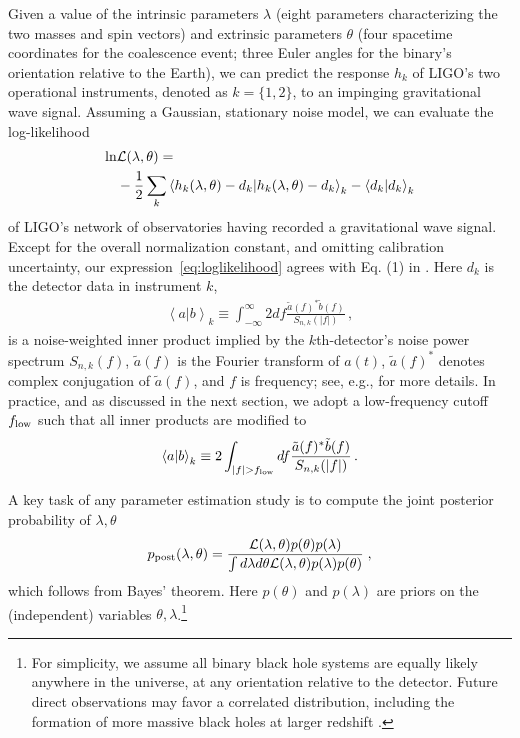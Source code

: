 \documentclass[aps,prd,nofootinbib,showpacs,amssymb,twocolumn]{revtex4}
\newcommand\qmstateproduct[2]{\left<#1|#2\right>}
\begin{document}
%
Given a value of the intrinsic parameters $\lambda$ (eight parameters characterizing the two masses and spin vectors)
and extrinsic parameters $\theta$ (four spacetime coordinates for the coalescence
event; three Euler
angles for the binary's orientation relative to the Earth),  we can predict the response $h_k$ of 
LIGO's two operational instruments, denoted as  $k=\{1,2\}$, to an impinging
gravitational wave signal.
%
%
Assuming a Gaussian, stationary noise model, we can evaluate the log-likelihood
\begin{align} \label{eq:loglikelihood}
\ln & {\cal L}(\lambda, \theta) = \nonumber \\
& -\frac{1}{2}\sum_k \qmstateproduct{h_k(\lambda,\theta)-d_k}{h_k(\lambda,\theta)-d_k}_k  
%
 - \qmstateproduct{d_k}{d_k}_k
%
%
%
%
%
%
%
%
%
%
%
\end{align}
of LIGO's network of observatories having recorded a gravitational wave signal.
Except for the overall normalization constant,
%
and omitting calibration uncertainty,
%
our expression~\eqref{eq:loglikelihood}
agrees with Eq. (1) in \cite{PEPaper}.
%
Here $d_k$ is the
detector data in instrument $k$, 
\begin{align*}
%
\qmstateproduct{a}{b}_k \equiv \int_{-\infty}^{\infty} 2 df \frac{\tilde{a}(f)^*\tilde{b}(f)}{S_{n,k}(|f|)} \,,
\end{align*}
is a 
noise-weighted inner product implied by the $k$th-detector's noise power spectrum
$S_{n,k}(f)$, $\tilde{a}(f)$ is the Fourier transform of $a(t)$,
$\tilde{a}(f)^*$ denotes complex conjugation of $\tilde{a}(f)$,
and $f$ is frequency;  see, e.g., \cite{gwastro-PE-AlternativeArchitectures} for more details. 
In practice, and as discussed in the
next section, we adopt a low-frequency cutoff $f_{\rm low}$
such that all inner products are modified to
\begin{eqnarray}
%
\qmstateproduct{a}{b}_k\equiv 2 \int_{|f|>f_{\rm low}}  df \frac{\tilde{a}(f)^*\tilde{b}(f)}{S_{n,k}(|f|)} \,.
\end{eqnarray}

A key task of any parameter estimation study is to 
%
compute
the joint posterior probability of $\lambda,\theta$
\begin{eqnarray}
\label{eq:Posterior:General}
p_{\rm post}(\lambda,\theta) = \frac{{\cal L}(\lambda,\theta) p(\theta) p(\lambda)}{ \int d\lambda d\theta {\cal
  L}(\lambda,\theta) p(\lambda)p(\theta)} \; ,
\end{eqnarray}
which follows from Bayes' theorem.
Here $p(\theta)$ and $p(\lambda)$ are priors on the (independent) variables $\theta,\lambda$.\footnote{For simplicity,
  we assume all 
%
binary black hole systems are equally likely anywhere in the universe, at any orientation relative to the detector. Future direct observations may favor a
  correlated distribution, including  
the formation of more massive black holes at larger redshift \cite{2016Natur.534..512B}.
%
%
%
}
\end{document}

